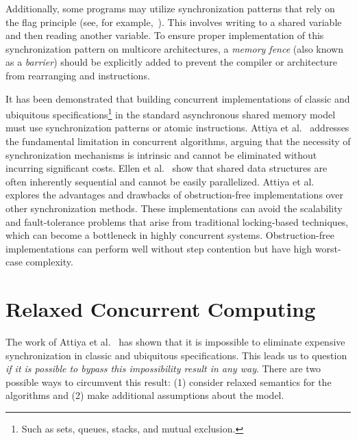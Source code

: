 Additionally, some programs may utilize \RAW synchronization patterns that rely on the flag principle (see, for example,~\cite {DBLP_books_daglib_0020056}). This involves writing to a shared variable and then reading another variable. To ensure proper implementation of this synchronization pattern on multicore architectures, a \textit{memory fence} (also known as a \textit{barrier}) should be explicitly added to prevent the compiler or architecture from rearranging \R and \W instructions.

It has been demonstrated that building concurrent implementations of classic and ubiquitous specifications\footnote{Such as sets, queues, stacks, and mutual exclusion.} in the standard asynchronous shared memory model must use \RAW synchronization patterns or atomic \RMW instructions. Attiya et al.~\cite{DBLP_conf_popl_AttiyaGHKMV11} addresses the fundamental limitation in concurrent algorithms, arguing that the necessity of synchronization mechanisms is intrinsic and cannot be eliminated without incurring significant costs. Ellen et al.~\cite{DBLP_journals_siamcomp_EllenHS12} show that shared data structures are often inherently sequential and cannot be easily parallelized. Attiya et al.~\cite{DBLP_journals_jacm_AttiyaGHK09} explores the advantages and drawbacks of obstruction-free implementations over other synchronization methods. These implementations can avoid the scalability and fault-tolerance problems that arise from traditional locking-based techniques, which can become a bottleneck in highly concurrent systems. Obstruction-free implementations can perform well without step contention but have high worst-case complexity.

\section{\label{section:relaxed-concurrent}Relaxed Concurrent Computing}

The work of Attiya et al.~\cite{DBLP_conf_popl_AttiyaGHKMV11} has shown that it is impossible to eliminate expensive synchronization in classic and ubiquitous specifications. This leads us to question \textit{if it is possible to bypass this impossibility result in any way}. There are two possible ways to circumvent this result: (1) consider relaxed semantics for the algorithms and (2) make additional assumptions about the model.

